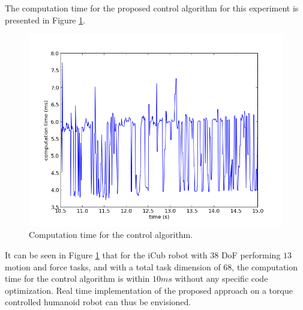 \documentclass[letterpaper, 10 pt, conference]{ieeeconf}  %
\begin{document}
The computation time for the proposed control algorithm for this experiment is presented in Figure \ref{computation_cost}.
\begin{figure}[htbp]
\centering
\includegraphics[width=\linewidth]{../figure/consum.png} 
\caption{\label{computation_cost} Computation time for the control algorithm.}
\end{figure}
It can be seen in Figure \ref{computation_cost} that for the iCub robot with $38$ DoF performing $13$ motion and force tasks, and with a total task dimension of $68$, the computation time for the control algorithm is within $10 ms$ without any specific code optimization. Real time implementation of the proposed approach on a torque controlled humanoid robot can thus be envisioned.
\end{document}
